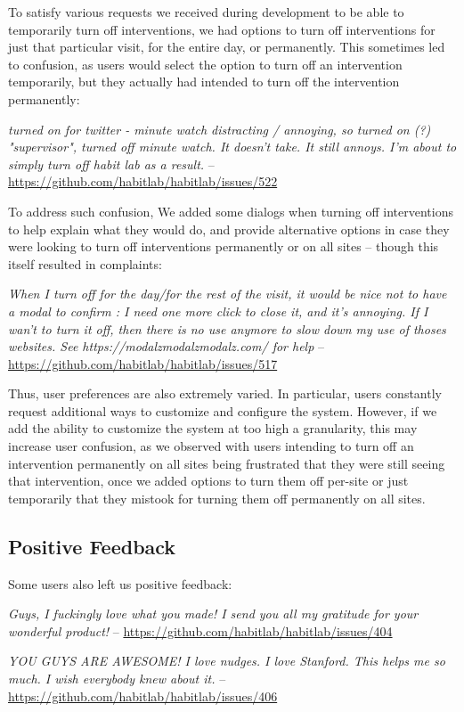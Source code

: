 To satisfy various requests we received during development to be able to temporarily turn off interventions, we had options to turn off interventions for just that particular visit, for the entire day, or permanently. This sometimes led to confusion, as users would select the option to turn off an intervention temporarily, but they actually had intended to turn off the intervention permanently:

\textit{turned on for twitter - minute watch distracting / annoying, so turned on (?) "supervisor", turned off minute watch. It doesn't take. It still annoys. I'm about to simply turn off habit lab as a result.} -- \url{https://github.com/habitlab/habitlab/issues/522}

To address such confusion, We added some dialogs when turning off interventions to help explain what they would do, and provide alternative options in case they were looking to turn off interventions permanently or on all sites -- though this itself resulted in complaints:

\textit{When I turn off for the day/for the rest of the visit, it would be nice not to have a modal to confirm : I need one more click to close it, and it's annoying. If I wan't to turn it off, then there is no use anymore to slow down my use of thoses websites. See https://modalzmodalzmodalz.com/ for help} -- \url{https://github.com/habitlab/habitlab/issues/517}

Thus, user preferences are also extremely varied. In particular, users constantly request additional ways to customize and configure the system. However, if we add the ability to customize the system at too high a granularity, this may increase user confusion, as we observed with users intending to turn off an intervention permanently on all sites being frustrated that they were still seeing that intervention, once we added options to turn them off per-site or just temporarily that they mistook for turning them off permanently on all sites.

\subsection{Positive Feedback}

Some users also left us positive feedback:

\textit{Guys, I fuckingly love what you made! I send you all my gratitude for your wonderful product!} -- \url{https://github.com/habitlab/habitlab/issues/404}

\textit{YOU GUYS ARE AWESOME! I love nudges. I love Stanford. This helps me so much. I wish everybody knew about it.} -- \url{https://github.com/habitlab/habitlab/issues/406}
